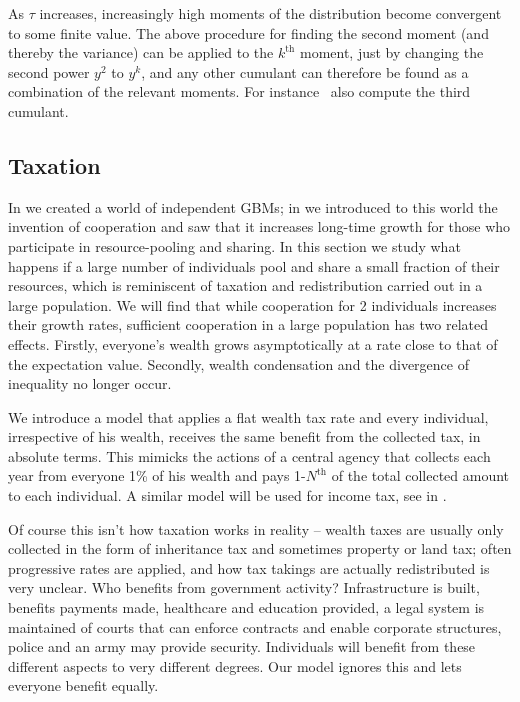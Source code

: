As $\tau$ increases, increasingly high moments of the distribution become convergent to some finite value. 
The above procedure for finding the second moment (and thereby the variance) can be applied to the $k^\text{th}$ moment, just by changing the second power $y^2$ to $y^k$, and any other cumulant can therefore be found as a combination of the relevant moments. 
For instance~\cite{LiuSerota2016} also compute the third cumulant.


\subsection{Taxation}
In  we created a world of independent GBMs; in  
we introduced to this world
the invention of cooperation and saw that it increases long-time growth for those who participate
in resource-pooling and sharing. In this section we study what happens if a large number
of individuals pool and share a small fraction of their resources, which is reminiscent of taxation
and redistribution carried out in a large population. We will find that while cooperation for 2 individuals
increases their growth rates, sufficient cooperation in a large population
has two related effects. Firstly, everyone's wealth grows asymptotically at a rate close to that of
the expectation value. Secondly, wealth condensation and the divergence of inequality 
no longer occur.

We introduce a model that applies a flat wealth tax rate and every individual, irrespective of his 
wealth, receives the same benefit from the collected tax, in absolute terms. This mimicks the
actions of a central agency that collects each year from everyone 1\% of his wealth and pays 
1-$N^\text{th}$ of the total collected amount to each individual. A similar model will be 
used for income tax, see  in . 

Of course this isn't how taxation works in reality -- wealth taxes are usually only collected in 
the form of inheritance tax and sometimes property or land tax; often progressive rates are 
applied, and how tax takings are actually redistributed is very unclear. 
Who benefits from government activity? Infrastructure is built, benefits payments made, 
healthcare and education provided, a legal system is maintained of courts that can 
enforce contracts and enable corporate structures, police and an army may provide security. 
Individuals will benefit from these different aspects to very different degrees. Our model 
ignores this and lets everyone benefit equally.

